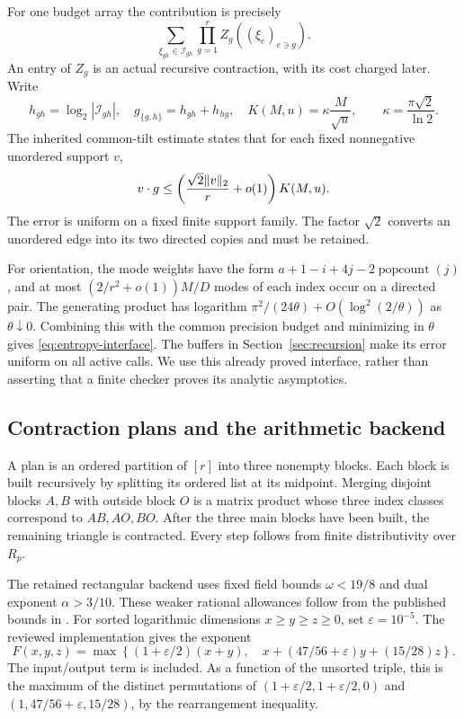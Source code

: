For one budget array the contribution is precisely
\begin{equation}\label{eq:finite-sum}
 \sum_{\xi_{gh}\in\mathcal I_{gh}}
       \prod_{g=1}^r Z_g((\xi_e)_{e\ni g}).
\end{equation}
An entry of $Z_g$ is an actual recursive contraction, with its cost charged
later. Write
\[
 h_{gh}=\log_2|\mathcal I_{gh}|,\quad
 g_{\{g,h\}}=h_{gh}+h_{hg},\quad
 K(M,u)=\kappa\frac M{\sqrt u},\qquad
 \kappa=\frac{\pi\sqrt2}{\ln2}.
\]
The inherited common-tilt estimate states that for each fixed nonnegative
unordered support $v$,
\begin{equation}\label{eq:entropy-interface}
 v\cdot g\le\left(\frac{\sqrt2\lVert v\rVert_2}{r}+o(1)\right)K(M,u).
\end{equation}
The error is uniform on a fixed finite support family. The factor
$\sqrt2$ converts an unordered edge into its two directed copies and must
be retained.

For orientation, the mode weights have the form
$a+1-i+4j-2\operatorname{popcount}(j)$, and at most
$(2/r^2+o(1))M/D$ modes of each index occur on a directed pair.
The generating product has logarithm
$\pi^2/(24\theta)+O(\log^2(2/\theta))$ as $\theta\downarrow0$.
Combining this with the common precision budget and minimizing in $\theta$
gives \eqref{eq:entropy-interface}. The buffers in Section~\ref{sec:recursion}
make its error uniform on all active calls. We use this already proved
interface, rather than asserting that a finite checker proves its analytic
asymptotics.

\subsection{Contraction plans and the arithmetic backend}

A plan is an ordered partition of $[r]$ into three nonempty blocks. Each
block is built recursively by splitting its ordered list at its midpoint.
Merging disjoint blocks $A,B$ with outside block $O$ is a matrix product
whose three index classes correspond to $AB,AO,BO$. After the three main
blocks have been built, the remaining triangle is contracted.
Every step follows from finite distributivity over $R_p$.

The retained rectangular backend uses fixed field bounds
$\omega<19/8$ and dual exponent $\alpha>3/10$. These weaker rational
allowances follow from the published bounds in \cite{matrix}.
For sorted logarithmic dimensions $x\ge y\ge z\ge0$, set
$\varepsilon=10^{-5}$. The reviewed implementation gives the exponent
\begin{equation}\label{eq:rect-cost}
 F(x,y,z)=\max\left\{
 (1+\varepsilon/2)(x+y),\quad
 x+(47/56+\varepsilon)y+(15/28)z
 \right\}.
\end{equation}
The input/output term is included. As a function of the unsorted triple,
this is the maximum of the distinct permutations of
$(1+\varepsilon/2,1+\varepsilon/2,0)$ and
$(1,47/56+\varepsilon,15/28)$, by the rearrangement inequality.

